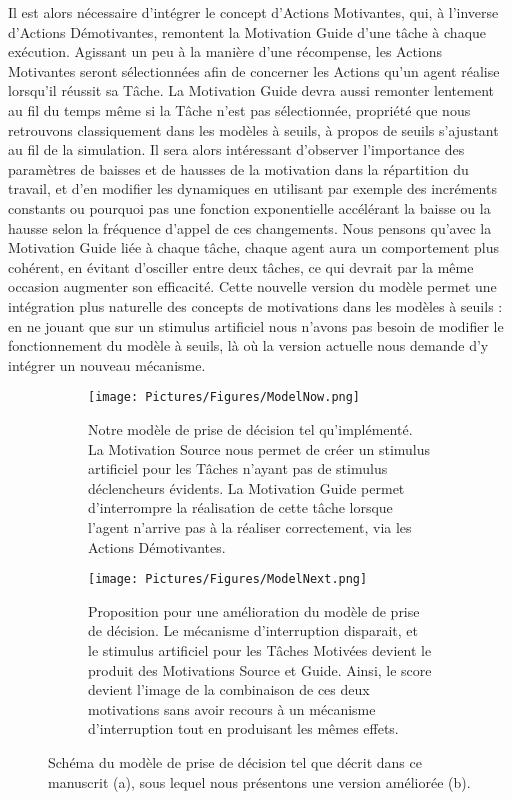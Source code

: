 	Il est alors nécessaire d'intégrer le concept d'Actions Motivantes, qui, à l'inverse d'Actions Démotivantes, remontent la Motivation Guide d'une tâche à chaque exécution. Agissant un peu à la manière d'une récompense, les Actions Motivantes seront sélectionnées afin de concerner les Actions qu'un agent réalise lorsqu'il réussit sa Tâche. La Motivation Guide devra aussi remonter lentement au fil du temps même si la Tâche n'est pas sélectionnée, propriété que nous retrouvons classiquement dans les modèles à seuils, à propos de seuils s'ajustant au fil de la simulation. Il sera alors intéressant d'observer l'importance des paramètres de baisses et de hausses de la motivation dans la répartition du travail, et d'en modifier les dynamiques en utilisant par exemple des incréments constants ou pourquoi pas une fonction exponentielle accélérant la baisse ou la hausse selon la fréquence d'appel de ces changements. Nous pensons qu'avec la Motivation Guide liée à chaque tâche, chaque agent aura un comportement plus cohérent, en évitant d'osciller entre deux tâches, ce qui devrait par la même occasion augmenter son efficacité. Cette nouvelle version du modèle permet une intégration plus naturelle des concepts de motivations dans les modèles à seuils : en ne jouant que sur un stimulus artificiel nous n'avons pas besoin de modifier le fonctionnement du modèle à seuils, là où la version actuelle nous demande d'y intégrer un nouveau mécanisme.
	
	\begin{figure}
	\centering
	
	\begin{subfigure}{\textwidth}
	\centering
	\texttt{[image: Pictures/Figures/ModelNow.png]}
	\caption{Notre modèle de prise de décision tel qu'implémenté. La Motivation Source nous permet de créer un stimulus artificiel pour les Tâches n'ayant pas de stimulus déclencheurs évidents. La Motivation Guide permet d'interrompre la réalisation de cette tâche lorsque l'agent n'arrive pas à la réaliser correctement, via les Actions Démotivantes.}
	\label{ModelNow}	
	\end{subfigure}
	
	\begin{subfigure}{\textwidth}
	\centering
	\texttt{[image: Pictures/Figures/ModelNext.png]}
	\caption{Proposition pour une amélioration du modèle de prise de décision. Le mécanisme d'interruption disparait, et le stimulus artificiel pour les Tâches Motivées devient le produit des Motivations Source et Guide. Ainsi, le score devient l'image de la combinaison de ces deux motivations sans avoir recours à un mécanisme d'interruption tout en produisant les mêmes effets.}
	\label{ModelNext}
	\end{subfigure}
	
	\caption{Schéma du modèle de prise de décision tel que décrit dans ce manuscrit (a), sous lequel nous présentons une version améliorée (b).}	
	\label{ModelsBeforeAfter}
	\end{figure}
	
